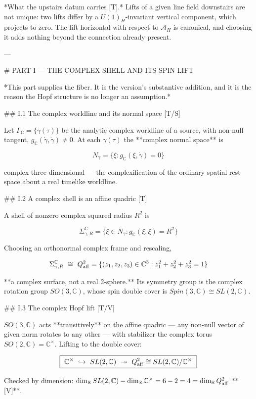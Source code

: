 *What the upstairs datum carries [T].* Lifts of a given line field downstairs are not unique: two lifts differ by a $U(1)_H$-invariant vertical component, which projects to zero. The lift horizontal with respect to $\mathcal{A}_H$ is canonical, and choosing it adds nothing beyond the connection already present.

---

# PART I — THE COMPLEX SHELL AND ITS SPIN LIFT

*This part supplies the fiber. It is the version's substantive addition, and it is the reason the Hopf structure is no longer an assumption.*

## I.1 The complex worldline and its normal space [T/S]

Let $\Gamma_\mathbb{C} = \{\gamma(\tau)\}$ be the analytic complex worldline of a source, with non-null tangent, $g_\mathbb{C}(\dot\gamma,\dot\gamma)\neq0$. At each $\gamma(\tau)$ the **complex normal space** is

$$N_\gamma = \{\xi : g_\mathbb{C}(\xi,\dot\gamma) = 0\}$$

complex three-dimensional — the complexification of the ordinary spatial rest space about a real timelike worldline.

## I.2 A complex shell is an affine quadric [T]

A shell of nonzero complex squared radius $R^2$ is

$$\Sigma^\mathbb{C}_{\gamma,R} = \{\xi\in N_\gamma : g_\mathbb{C}(\xi,\xi) = R^2\}$$

Choosing an orthonormal complex frame and rescaling,

$$\Sigma^\mathbb{C}_{\gamma,R}\ \cong\ Q^2_{\rm aff} = \{(z_1,z_2,z_3)\in\mathbb{C}^3 : z_1^2+z_2^2+z_3^2 = 1\}$$

**a complex surface, not a real 2-sphere.** Its symmetry group is the complex rotation group $SO(3,\mathbb{C})$, whose spin double cover is $Spin(3,\mathbb{C})\cong SL(2,\mathbb{C})$.

## I.3 The complex Hopf lift [T/V]

$SO(3,\mathbb{C})$ acts **transitively** on the affine quadric — any non-null vector of given norm rotates to any other — with stabilizer the complex torus $SO(2,\mathbb{C}) = \mathbb{C}^\times$. Lifting to the double cover:

$$\boxed{\ \mathbb{C}^\times\ \hookrightarrow\ SL(2,\mathbb{C})\ \twoheadrightarrow\ Q^2_{\rm aff}\cong SL(2,\mathbb{C})/\mathbb{C}^\times\ }$$

Checked by dimension: $\dim_\mathbb{R}SL(2,\mathbb{C}) - \dim_\mathbb{R}\mathbb{C}^\times = 6-2 = 4 = \dim_\mathbb{R}Q^2_{\rm aff}$ **[V]**.

